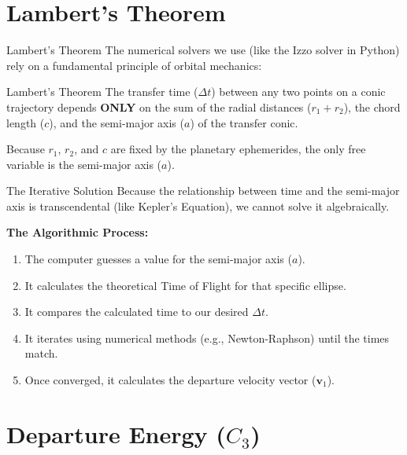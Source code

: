 \documentclass[11pt]{beamer}
\begin{document}
\section{Lambert's Theorem}

\begin{frame}{Lambert's Theorem}
    The numerical solvers we use (like the Izzo solver in Python) rely on a fundamental principle of orbital mechanics:
    
    \vspace{0.3cm}
    \begin{block}{Lambert's Theorem}
        The transfer time ($\Delta t$) between any two points on a conic trajectory depends \textbf{ONLY} on the sum of the radial distances ($r_1 + r_2$), the chord length ($c$), and the semi-major axis ($a$) of the transfer conic.
    \end{block}
    
    \vspace{0.3cm}
    Because $r_1$, $r_2$, and $c$ are fixed by the planetary ephemerides, the only free variable is the semi-major axis ($a$).
\end{frame}

\begin{frame}{The Iterative Solution}
    Because the relationship between time and the semi-major axis is transcendental (like Kepler's Equation), we cannot solve it algebraically.
    
    \vspace{0.3cm}
    \textbf{The Algorithmic Process:}
    \begin{enumerate}
        \item The computer guesses a value for the semi-major axis ($a$).
        \item It calculates the theoretical Time of Flight for that specific ellipse.
        \item It compares the calculated time to our desired $\Delta t$.
        \item It iterates using numerical methods (e.g., Newton-Raphson) until the times match.
        \item Once converged, it calculates the departure velocity vector ($\bm{v}_1$).
    \end{enumerate}
\end{frame}

\section{Departure Energy ($C_3$)}
\end{document}
